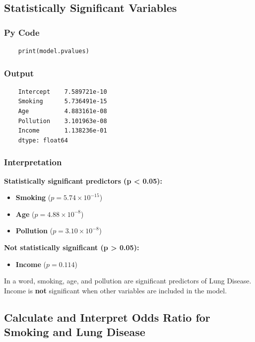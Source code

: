\documentclass[a4paper,12pt]{article}
\begin{document}
\subsection{Statistically Significant Variables}

\subsubsection{Py Code}
\begin{lstlisting}
	print(model.pvalues)
\end{lstlisting}

\subsubsection{Output}
\begin{verbatim}
	Intercept    7.589721e-10
	Smoking      5.736491e-15
	Age          4.883161e-08
	Pollution    3.101963e-08
	Income       1.138236e-01
	dtype: float64
\end{verbatim}

\subsubsection{Interpretation}
\textbf{Statistically significant predictors (p < 0.05):}
\begin{itemize}
	\item \textbf{Smoking} ($p = 5.74 \times 10^{-15}$)
	\item  \textbf{Age} ($p = 4.88 \times 10^{-8}$)
	\item  \textbf{Pollution} ($p = 3.10 \times 10^{-8}$)
\end{itemize}

\textbf{Not statistically significant (p > 0.05):}
\begin{itemize}
	\item \textbf{Income} ($p = 0.114$)
\end{itemize}

In a word, smoking, age, and pollution are significant predictors of Lung Disease. 
Income is \textbf{not} significant when other variables are included in the model.


\subsection{Calculate and Interpret Odds Ratio for Smoking and Lung Disease}
\end{document}
